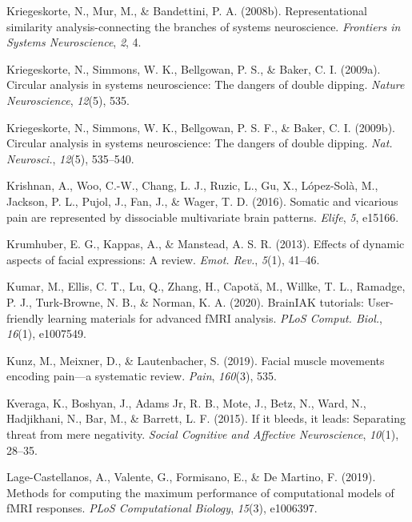 \documentclass[11pt,american,a4paper,oneside,]{memoir} %
\begin{document}
\leavevmode\hypertarget{ref-kriegeskorte2008representational}{}%
Kriegeskorte, N., Mur, M., \& Bandettini, P. A. (2008b). Representational similarity analysis-connecting the branches of systems neuroscience. \emph{Frontiers in Systems Neuroscience}, \emph{2}, 4.

\leavevmode\hypertarget{ref-kriegeskorte2009circular}{}%
Kriegeskorte, N., Simmons, W. K., Bellgowan, P. S., \& Baker, C. I. (2009a). Circular analysis in systems neuroscience: The dangers of double dipping. \emph{Nature Neuroscience}, \emph{12}(5), 535.

\leavevmode\hypertarget{ref-Kriegeskorte2009-yz}{}%
Kriegeskorte, N., Simmons, W. K., Bellgowan, P. S. F., \& Baker, C. I. (2009b). Circular analysis in systems neuroscience: The dangers of double dipping. \emph{Nat. Neurosci.}, \emph{12}(5), 535--540.

\leavevmode\hypertarget{ref-krishnan2016somatic}{}%
Krishnan, A., Woo, C.-W., Chang, L. J., Ruzic, L., Gu, X., López-Solà, M., Jackson, P. L., Pujol, J., Fan, J., \& Wager, T. D. (2016). Somatic and vicarious pain are represented by dissociable multivariate brain patterns. \emph{Elife}, \emph{5}, e15166.

\leavevmode\hypertarget{ref-Krumhuber2013-qi}{}%
Krumhuber, E. G., Kappas, A., \& Manstead, A. S. R. (2013). Effects of dynamic aspects of facial expressions: A review. \emph{Emot. Rev.}, \emph{5}(1), 41--46.

\leavevmode\hypertarget{ref-Kumar2020-eo}{}%
Kumar, M., Ellis, C. T., Lu, Q., Zhang, H., Capotă, M., Willke, T. L., Ramadge, P. J., Turk-Browne, N. B., \& Norman, K. A. (2020). BrainIAK tutorials: User-friendly learning materials for advanced fMRI analysis. \emph{PLoS Comput. Biol.}, \emph{16}(1), e1007549.

\leavevmode\hypertarget{ref-Kunz2019-uh}{}%
Kunz, M., Meixner, D., \& Lautenbacher, S. (2019). Facial muscle movements encoding pain---a systematic review. \emph{Pain}, \emph{160}(3), 535.

\leavevmode\hypertarget{ref-kveraga2015if}{}%
Kveraga, K., Boshyan, J., Adams Jr, R. B., Mote, J., Betz, N., Ward, N., Hadjikhani, N., Bar, M., \& Barrett, L. F. (2015). If it bleeds, it leads: Separating threat from mere negativity. \emph{Social Cognitive and Affective Neuroscience}, \emph{10}(1), 28--35.

\leavevmode\hypertarget{ref-lage2019methods}{}%
Lage-Castellanos, A., Valente, G., Formisano, E., \& De Martino, F. (2019). Methods for computing the maximum performance of computational models of fMRI responses. \emph{PLoS Computational Biology}, \emph{15}(3), e1006397.
\end{document}
